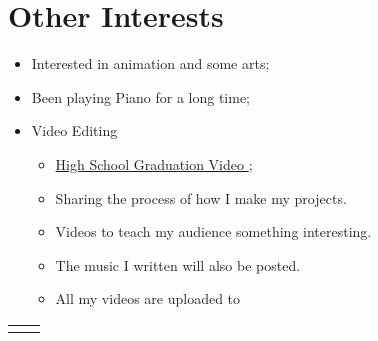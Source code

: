   \section{Other Interests}

  \begin{itemize}[itemsep=0.1\parskip]
    \item Interested in animation and some arts; 
    \item Been playing Piano for a long time;
    \item Video Editing
    \begin{itemize}
      \item \href{https://www.bilibili.com/video/av55212868/}{\color{link}High School Graduation Video \bilibiliicon{}};
      \item Sharing the process of how I make my projects.
      \item Videos to teach my audience something interesting.
      \item The music I written will also be posted.
      \item All my videos are uploaded to \href{https://www.bilibili.com/}{\bilibiliicon{}\bilibiliwordicon{}}
    \end{itemize}
  \end{itemize}
  \mbox{}
  \vfill{
    \begin{flushright}
      \begin{tabular}{ c c }
        \bilishield{} & \gitshield{}
      \end{tabular}
    \end{flushright}
  }

